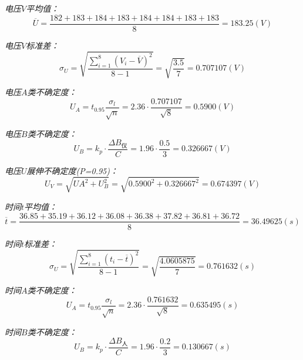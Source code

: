 \documentclass[UTF8]{ctexart}
\begin{document}
    \emph{电压$V$平均值：}
        \begin{equation*}
            \overline{U}=\frac{182	 +183+	184+	183+	184+	184	+183	+183}{8} =183.25(V)
        \end{equation*}

        \emph{电压$V$标准差：}
        \begin{equation*}
            \sigma _{U}=\sqrt{\frac{\sum_{i=1}^8(V_i-\overline{V})^2}{8-1}} =\sqrt{\frac{3.5}{7}}=0.707107(V)
        \end{equation*}

        \emph{电压$A$类不确定度：}
        \begin{equation*}
            U_A=t_{0.95}\frac{\sigma_l}{\sqrt{n}}=2.36·\frac{0.707107}{\sqrt{8}}=0.5900(V)
        \end{equation*}

        \emph{电压$B$类不确定度：}
        \begin{equation*}
            U_{B}=k_p·\frac{\varDelta B_仪}{C}=1.96·\frac{0.5}{3}=0.326667(V)
        \end{equation*}

        \emph{电压$U$展伸不确定度(P=0.95)：}
        \begin{equation*}
           U_{V}=\sqrt{UA^2+U_B^2}= \sqrt{0.5900^2+0.326667^2}=0.674397(V)
        \end{equation*}


        \emph{时间$t$平均值：}
        \begin{equation*}
            \overline{t}=\frac{36.85	+35.19+	36.12	+36.08+	36.38	+37.82+	36.81	+36.72}{8} =36.49625(s)
        \end{equation*}

        \emph{时间$t$标准差：}
        \begin{equation*}
            \sigma _{U}=\sqrt{\frac{\sum_{i=1}^8(t_i-\overline{t})^2}{8-1}} =\sqrt{\frac{4.0605875}{7}}=0.761632(s)
        \end{equation*}

        \emph{时间$A$类不确定度：}
        \begin{equation*}
            U_A=t_{0.95}\frac{\sigma_l}{\sqrt{n}}=2.36·\frac{0.761632}{\sqrt{8}}=0.635495(s)
        \end{equation*}

        \emph{时间$B$类不确定度：}
        \begin{equation*}
            U_{B}=k_p·\frac{\varDelta B_人}{C}=1.96·\frac{0.2}{3}=0.130667(s)
        \end{equation*}
\end{document}
